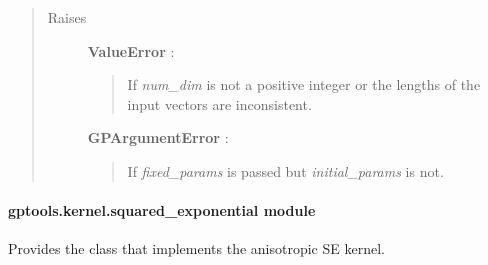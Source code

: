 \documentclass[letterpaper,10pt,english]{sphinxmanual}
\begin{document}
\begin{fulllineitems}
\begin{quote}
\begin{description}
\item[{Raises}] \leavevmode
\textbf{ValueError} :
\begin{quote}

If \emph{num\_dim} is not a positive integer or the lengths of
the input vectors are inconsistent.
\end{quote}

\textbf{GPArgumentError} :
\begin{quote}

If \emph{fixed\_params} is passed but \emph{initial\_params} is not.
\end{quote}

\end{description}\end{quote}

\end{fulllineitems}



\paragraph{gptools.kernel.squared\_exponential module}
\label{gptools.kernel:module-gptools.kernel.squared_exponential}\label{gptools.kernel:gptools-kernel-squared-exponential-module}
Provides the {\hyperref[gptools.kernel:gptools.kernel.squared_exponential.SquaredExponentialKernel]{}} class that implements the anisotropic SE kernel.
\end{document}
